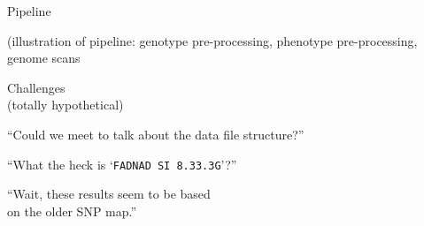 \documentclass[aspectratio=169,12pt,t]{beamer}
\begin{document}
\begin{frame}[c]{Pipeline}


(illustration of pipeline: genotype pre-processing, phenotype
  pre-processing, genome scans


\end{frame}



\begin{frame}[c]{}


\begin{center}
\Large
  {\color{title} Challenges} \\[24pt]
  {\lolit \large (totally hypothetical)}
\end{center}

\end{frame}





\begin{frame}[c]{}

\begin{center}
  \Large

  ``Could we meet to talk about the data file structure?'' \\[36pt]
\end{center}

\end{frame}



\begin{frame}[c]{}

\begin{center}
  \Large


``What the heck is `{\hilit \tt FAD{\textunderscore}NAD SI 8.3{\textunderscore}3.3G}'?''

\end{center}

\end{frame}





\begin{frame}[c]{}

\begin{center}
  \Large


  ``Wait, these results seem to be based \\
  on the older SNP map.''

\end{center}

\end{frame}
\end{document}
